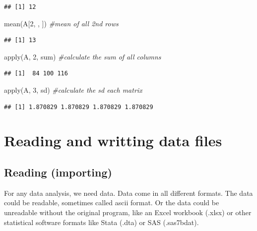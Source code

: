\documentclass[
]{book}
\newenvironment{Shaded}{\begin{snugshade}}{\end{snugshade}}
\newcommand{\CommentTok}[1]{\textcolor[rgb]{0.56,0.35,0.01}{\textit{#1}}}
\newcommand{\DecValTok}[1]{\textcolor[rgb]{0.00,0.00,0.81}{#1}}
\newcommand{\FunctionTok}[1]{\textcolor[rgb]{0.00,0.00,0.00}{#1}}
\newcommand{\NormalTok}[1]{#1}
\theoremstyle{definition}
\theoremstyle{definition}
\theoremstyle{definition}
\theoremstyle{definition}
\theoremstyle{remark}
\begin{document}
\begin{verbatim}
## [1] 12
\end{verbatim}

\begin{Shaded}
\begin{Highlighting}[]
\FunctionTok{mean}\NormalTok{(A[}\DecValTok{2}\NormalTok{, , ])         }\CommentTok{\#mean of all 2nd rows}
\end{Highlighting}
\end{Shaded}

\begin{verbatim}
## [1] 13
\end{verbatim}

\begin{Shaded}
\begin{Highlighting}[]
\FunctionTok{apply}\NormalTok{(A, }\DecValTok{2}\NormalTok{, sum)       }\CommentTok{\#calculate the sum of all columns}
\end{Highlighting}
\end{Shaded}

\begin{verbatim}
## [1]  84 100 116
\end{verbatim}

\begin{Shaded}
\begin{Highlighting}[]
\FunctionTok{apply}\NormalTok{(A, }\DecValTok{3}\NormalTok{, sd)        }\CommentTok{\#calculate the sd each matrix}
\end{Highlighting}
\end{Shaded}

\begin{verbatim}
## [1] 1.870829 1.870829 1.870829 1.870829
\end{verbatim}

\hypertarget{reading-and-writting-data-files}{%
\chapter{Reading and writting data files}\label{reading-and-writting-data-files}}

\hypertarget{reading-importing}{%
\section{Reading (importing)}\label{reading-importing}}

For any data analysis, we need data. Data come in all different formats. The data could be readable, sometimes called ascii format. Or the data could be unreadable without the original program, like an Excel workbook (.xlsx) or other statistical software formats like Stata (.dta) or SAS (.sas7bdat).
\end{document}
